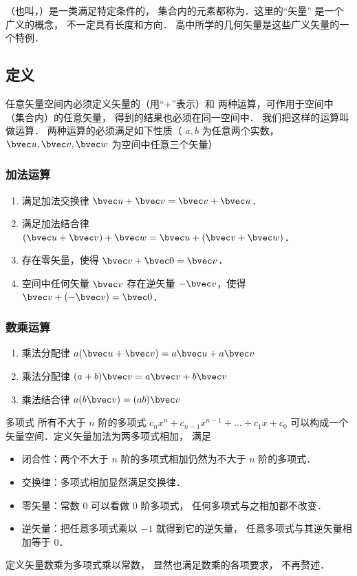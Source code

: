 

（也叫，）是一类满足特定条件的， 集合内的元素都称为．这里的“矢量” 是一个广义的概念， 不一定具有长度和方向． 高中所学的几何矢量是这些广义矢量的一个特例．

\subsection{定义}
任意矢量空间内必须定义矢量的（用“+”表示）和 两种运算，可作用于空间中（集合内）的任意矢量， 得到的结果也必须在同一空间中． 我们把这样的运算叫做运算． 两种运算的必须满足如下性质（ $a,b$ 为任意两个实数，$\bvec u,\bvec v,\bvec w$ 为空间中任意三个矢量）

\subsubsection{加法运算}
\begin{enumerate}
\item 满足加法交换律 $\bvec u + \bvec v = \bvec v + \bvec u$．
\item 满足加法结合律 $(\bvec u + \bvec v) + \bvec w = \bvec u + (\bvec v + \bvec w)$．
\item 存在零矢量，使得 $\bvec v + \bvec 0 = \bvec v$．
\item 空间中任何矢量 $\bvec v$ 存在逆矢量 $-\bvec v$，使得 $\bvec v + (-\bvec v) = \bvec 0$．
\end{enumerate}

\subsubsection{数乘运算}
\begin{enumerate}
\item 乘法分配律 $a(\bvec u + \bvec v) = a\bvec u + a\bvec v$ 
\item 乘法分配律 $(a + b)\bvec v = a\bvec v + b\bvec v$
\item 乘法结合律 $a (b \bvec v) = (ab) \bvec v$
\end{enumerate}

\begin{example}{多项式}\label{LSpace_ex1}
所有不大于 $n$ 阶的多项式 $c_n x^n + c_{n-1} x^{n-1} + \dots + c_1 x + c_0$ 可以构成一个矢量空间．定义矢量加法为两多项式相加， 满足
\begin{itemize}
\item 闭合性：两个不大于 $n$ 阶的多项式相加仍然为不大于 $n$ 阶的多项式．
\item 交换律：多项式相加显然满足交换律．
\item 零矢量：常数 0 可以看做 0 阶多项式， 任何多项式与之相加都不改变．
\item 逆矢量：把任意多项式乘以 $-1$ 就得到它的逆矢量， 任意多项式与其逆矢量相加等于 0．
\end{itemize}
定义矢量数乘为多项式乘以常数， 显然也满足数乘的各项要求， 不再赘述．
\end{example}

